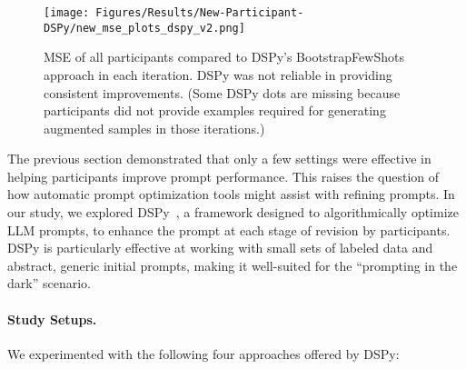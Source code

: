 \begin{figure*}
    \centering
    \texttt{[image: Figures/Results/New-Participant-DSPy/new\_mse\_plots\_dspy\_v2.png]}
    \caption{MSE of all participants compared to DSPy's BootstrapFewShots approach in each iteration. DSPy was not reliable in providing consistent improvements. (Some DSPy dots are missing because participants did not provide examples required for generating augmented samples in those iterations.)}
    \label{fig:mse-participant-plus-dspy}
\end{figure*}


The previous section demonstrated that only a few settings were effective in helping participants improve prompt performance. 
This raises the question of how automatic prompt optimization tools might assist with refining prompts.
In our study, we explored DSPy~\cite{khattab2023dspy}, a framework designed to algorithmically optimize LLM prompts, to enhance the prompt at each stage of revision by participants. 
DSPy is particularly effective at working with small sets of labeled data and abstract, generic initial prompts, making it well-suited for the ``prompting in the dark'' scenario.

\paragraph{Study Setups.}

We experimented with the following four approaches offered by DSPy:

